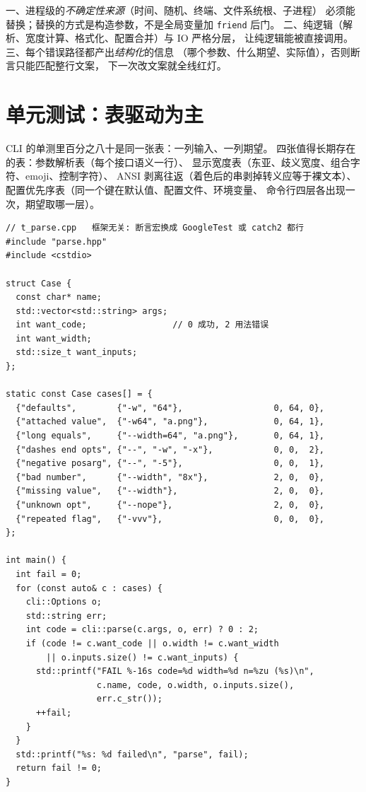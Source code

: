 \documentclass[12pt,a4paper,fontset=fandol]{ctexbook}
\newcommand{\Tp}[1]{\texttt{#1}}
\begin{document}
\begin{bestpractice}[title={可测性的三条注入纪律}]
一、进程级的\emph{不确定性来源}（时间、随机、终端、文件系统根、子进程）
必须能替换；替换的方式是构造参数，不是全局变量加 \Tp{friend} 后门。
二、纯逻辑（解析、宽度计算、格式化、配置合并）与 IO 严格分层，
让纯逻辑能被直接调用。三、每个错误路径都产出\emph{结构化}的信息
（哪个参数、什么期望、实际值），否则断言只能匹配整行文案，
下一次改文案就全线红灯。
\end{bestpractice}

\section{单元测试：表驱动为主}

CLI 的单测里百分之八十是同一张表：一列输入、一列期望。
四张值得长期存在的表：参数解析表（每个接口语义一行）、
显示宽度表（东亚、歧义宽度、组合字符、emoji、控制字符）、
ANSI 剥离往返（着色后的串剥掉转义应等于裸文本）、
配置优先序表（同一个键在默认值、配置文件、环境变量、
命令行四层各出现一次，期望取哪一层）。

\begin{lstlisting}[caption={表驱动单测：解析用例即数据}]
// t_parse.cpp   框架无关: 断言宏换成 GoogleTest 或 catch2 都行
#include "parse.hpp"
#include <cstdio>

struct Case {
  const char* name;
  std::vector<std::string> args;
  int want_code;                 // 0 成功, 2 用法错误
  int want_width;
  std::size_t want_inputs;
};

static const Case cases[] = {
  {"defaults",        {"-w", "64"},                  0, 64, 0},
  {"attached value",  {"-w64", "a.png"},             0, 64, 1},
  {"long equals",     {"--width=64", "a.png"},       0, 64, 1},
  {"dashes end opts", {"--", "-w", "-x"},            0, 0,  2},
  {"negative posarg", {"--", "-5"},                  0, 0,  1},
  {"bad number",      {"--width", "8x"},             2, 0,  0},
  {"missing value",   {"--width"},                   2, 0,  0},
  {"unknown opt",     {"--nope"},                    2, 0,  0},
  {"repeated flag",   {"-vvv"},                      0, 0,  0},
};

int main() {
  int fail = 0;
  for (const auto& c : cases) {
    cli::Options o;
    std::string err;
    int code = cli::parse(c.args, o, err) ? 0 : 2;
    if (code != c.want_code || o.width != c.want_width
        || o.inputs.size() != c.want_inputs) {
      std::printf("FAIL %-16s code=%d width=%d n=%zu (%s)\n",
                  c.name, code, o.width, o.inputs.size(),
                  err.c_str());
      ++fail;
    }
  }
  std::printf("%s: %d failed\n", "parse", fail);
  return fail != 0;
}
\end{lstlisting}
\end{document}

